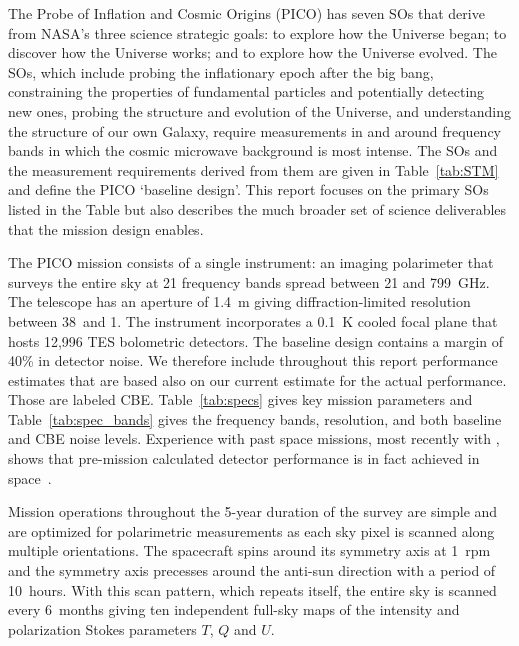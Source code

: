 \documentclass[PICOReport.tex]{subfiles}
\begin{document}
 
 
The Probe of Inflation and Cosmic Origins (PICO) has seven \ac{SOs} that derive from NASA's three science strategic goals: to explore how the Universe began; to discover how the Universe works; and to explore how the Universe evolved. The \ac{SOs}, which include probing the inflationary epoch after the big bang, constraining the properties of fundamental particles and potentially detecting new ones, probing the structure and evolution of the Universe, and understanding the structure of our own Galaxy, require measurements in and around frequency bands in which the cosmic microwave background is most intense. The \ac{SOs} and the measurement requirements derived from them are given in Table~\ref{tab:STM} and define the PICO `baseline design'. 
This report focuses on the primary \ac{SOs} listed in the Table but also describes the much broader set of science deliverables that the mission design enables.

The PICO mission consists of a single instrument: an imaging polarimeter that surveys the entire sky at 21 frequency bands spread between 21 and 799~GHz.  The telescope has an aperture of 1.4~m giving diffraction-limited resolution between 38\arcmin\ and 1\arcmin . The instrument incorporates a 0.1~K cooled focal plane that hosts 12,996 \ac{TES} bolometric detectors. The baseline design contains a margin of 40\% in detector noise. We therefore include throughout this report performance estimates that are based also on our current estimate for the actual performance. Those are labeled \ac{CBE}. Table~\ref{tab:specs} gives key mission parameters and Table~\ref{tab:spec_bands} gives the frequency bands, resolution, and both baseline and \ac{CBE} noise levels. Experience with past space missions, most recently with \planck , shows that pre-mission calculated detector performance is in fact achieved in space~\citep{planck1101.2038,planck1101.2039,Jarosik}.

Mission operations throughout the 5-year duration of the survey are simple and are optimized for polarimetric measurements as each sky pixel is scanned along multiple orientations. The spacecraft spins around its symmetry axis at 1~rpm and the symmetry axis precesses around the anti-sun direction with a period of 10~hours. With this scan pattern, which repeats itself, the entire sky is scanned every 6~months giving ten independent full-sky maps of the intensity and polarization Stokes parameters $T$, $Q$ and $U$.  
\end{document}
